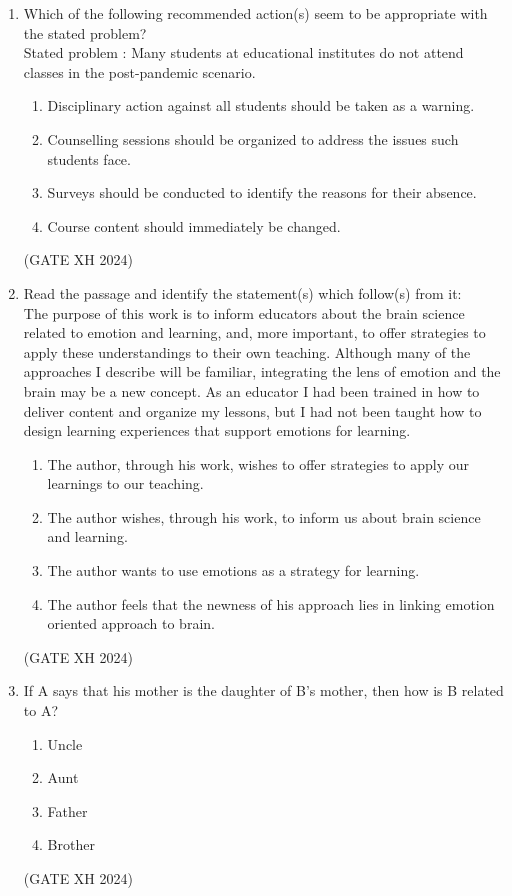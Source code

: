 \documentclass{article}
\begin{document}
\begin{enumerate}
    \item Which of the following recommended action(s) seem to be appropriate with the stated problem? \\
    Stated problem : Many students at educational institutes do not attend classes in the post-pandemic scenario.
    
    \begin{enumerate}
        \item Disciplinary action against all students should be taken as a warning.
        \item Counselling sessions should be organized to address the issues such students face.
        \item Surveys should be conducted to identify the reasons for their absence.
        \item Course content should immediately be changed.
    \end{enumerate} \hfill (GATE XH 2024)
    

    \item Read the passage and identify the statement(s) which follow(s) from it: \\
    The purpose of this work is to inform educators about the brain science related to emotion and learning, and, more important, to offer strategies to apply these understandings to their own teaching. Although many of the approaches I describe will be familiar, integrating the lens of emotion and the brain may be a new concept. As an educator I had been trained in how to deliver content and organize my lessons, but I had not been taught how to design learning experiences that support emotions for learning.
    
    \begin{enumerate}
        \item The author, through his work, wishes to offer strategies to apply our learnings to our teaching.
        \item The author wishes, through his work, to inform us about brain science and learning.
        \item The author wants to use emotions as a strategy for learning.
        \item The author feels that the newness of his approach lies in linking emotion oriented approach to brain.
    \end{enumerate} \hfill (GATE XH 2024)

    \item If A  says that his mother is the daughter of B’s mother, then how is B related to A?
    
    \begin{multicols}{4}
        \begin{enumerate}
            \item Uncle
            \item Aunt
            \item Father
            \item Brother
        \end{enumerate}
    \end{multicols} \hfill (GATE XH 2024)
\end{enumerate}
\end{document}
